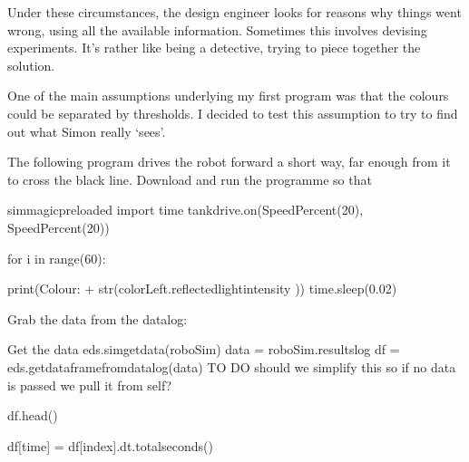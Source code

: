 \documentclass[letterpaper,10pt,english]{sphinxmanual}
\begin{document}
{Under these circumstances, the design engineer looks for reasons why things went wrong, using all the available information. Sometimes this involves devising experiments. It’s rather like being a detective, trying to piece together the solution.

One of the main assumptions underlying my first program was that the colours could be separated by thresholds. I decided to test this assumption to try to find out what Simon really ‘sees’.

The following program drives the robot forward a short way, far enough from it to cross the black line. Download and run the programme so that

{
\begin{sphinxVerbatim}[commandchars=\\\{\}]
\llap{\color{nbsphinxin}[ ]:\,\hspace{\fboxrule}\hspace{\fboxsep}}\PYGZpc{}\PYGZpc{}sim\PYGZus{}magic\PYGZus{}preloaded
import time
tank\PYGZus{}drive.on(SpeedPercent(20), SpeedPercent(20))

for i in range(60):

    print(\PYGZsq{}Colour: \PYGZsq{} + str(colorLeft.reflected\PYGZus{}light\PYGZus{}intensity ))
    time.sleep(0.02)
\end{sphinxVerbatim}
}

Grab the data from the datalog:

{
\begin{sphinxVerbatim}[commandchars=\\\{\}]
\llap{\color{nbsphinxin}[ ]:\,\hspace{\fboxrule}\hspace{\fboxsep}}\PYGZsh{} Get the data
\PYGZsh{}eds.sim\PYGZus{}get\PYGZus{}data(roboSim)
data = roboSim.results\PYGZus{}log
df = eds.get\PYGZus{}dataframe\PYGZus{}from\PYGZus{}datalog(data)
\PYGZsh{} TO DO \PYGZhy{} should we simplify this so if no data is passed we pull it from self?

df.head()
\end{sphinxVerbatim}
}

{
\begin{sphinxVerbatim}[commandchars=\\\{\}]
\llap{\color{nbsphinxin}[ ]:\,\hspace{\fboxrule}\hspace{\fboxsep}}df[\PYGZsq{}time\PYGZsq{}] = df[\PYGZsq{}index\PYGZsq{}].dt.total\PYGZus{}seconds()
\end{sphinxVerbatim}
}

}
\end{document}
